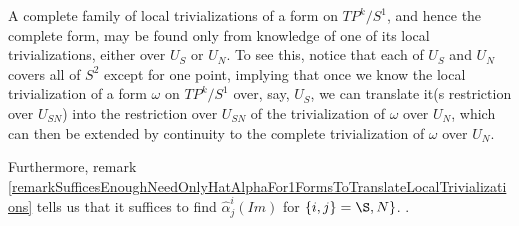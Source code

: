 \begin{example}[$P^k$]
A complete family of local trivializations of a form on $TP^k/S^1$, and hence the complete form, may be found only from knowledge of one of its local trivializations, either over $U_S$ or $U_N$. To see this, notice that each of $U_S$ and $U_N$ covers all of $S^2$ except for one point, implying that once we know the local trivialization of a form $\omega$ on $TP^k/S^1$ over, say, $U_S$, we can translate it(s restriction over $U_{SN}$) into the restriction over $U_{SN}$ of the trivialization of $\omega$ over $U_N$, which can then be extended by continuity to the complete trivialization of $\omega$ over $U_N$. 

Furthermore, remark \ref{remarkSufficesEnoughNeedOnlyHatAlphaFor1FormsToTranslateLocalTrivializations} tells us that it suffices to find $\hat \alpha^i_j(Im)$ for $\{i, j\} = \S, N\}$. .
\end{example}


